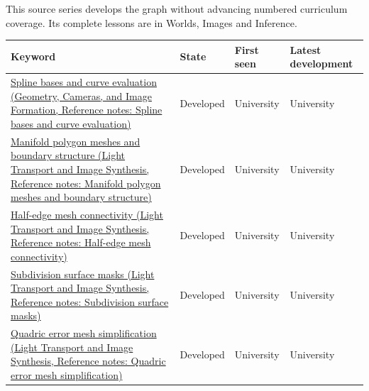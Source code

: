 This source series develops the graph without advancing numbered curriculum coverage. Its complete lessons are in {Worlds, Images and Inference}.

{\def\LTcaptype{none} %
\begin{longtable}[]{@{}
  >{\raggedright\arraybackslash}p{}
  >{\raggedright\arraybackslash}p{}
  >{\raggedright\arraybackslash}p{}
  >{\raggedright\arraybackslash}p{}@{}}
\toprule\noalign{}
\begin{minipage}[b]{\linewidth}\raggedright
Keyword
\end{minipage} & \begin{minipage}[b]{\linewidth}\raggedright
State
\end{minipage} & \begin{minipage}[b]{\linewidth}\raggedright
First seen
\end{minipage} & \begin{minipage}[b]{\linewidth}\raggedright
Latest development
\end{minipage} \\
\midrule\noalign{}
\endhead
\bottomrule\noalign{}
\endlastfoot
\href{../03-Geometry-Cameras-and-Image-Formation/main.pdf\#nameddest=appendix-f28eeec97a3d}{Spline bases and curve evaluation (Geometry, Cameras, and Image Formation, Reference notes: Spline bases and curve evaluation)} & Developed & University & University \\
\href{../04-Light-Transport-and-Image-Synthesis/main.pdf\#nameddest=appendix-fab348609369}{Manifold polygon meshes and boundary structure (Light Transport and Image Synthesis, Reference notes: Manifold polygon meshes and boundary structure)} & Developed & University & University \\
\href{../04-Light-Transport-and-Image-Synthesis/main.pdf\#nameddest=appendix-1aea26b2307f}{Half-edge mesh connectivity (Light Transport and Image Synthesis, Reference notes: Half-edge mesh connectivity)} & Developed & University & University \\
\href{../04-Light-Transport-and-Image-Synthesis/main.pdf\#nameddest=appendix-0234ab7f86b1}{Subdivision surface masks (Light Transport and Image Synthesis, Reference notes: Subdivision surface masks)} & Developed & University & University \\
\href{../04-Light-Transport-and-Image-Synthesis/main.pdf\#nameddest=appendix-1dd4ad54ca57}{Quadric error mesh simplification (Light Transport and Image Synthesis, Reference notes: Quadric error mesh simplification)} & Developed & University & University \\

\end{longtable}}
